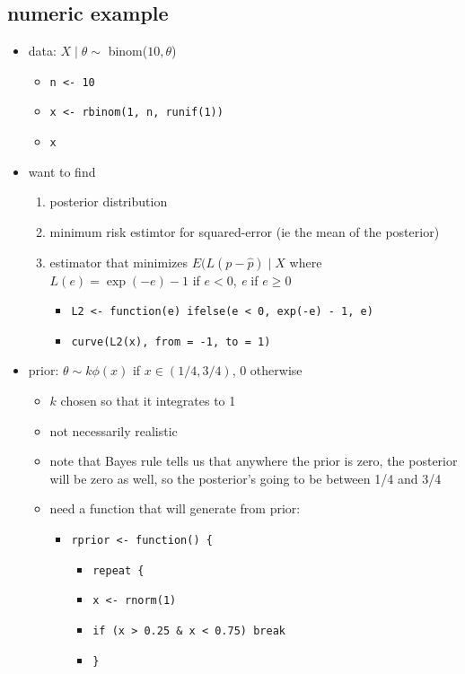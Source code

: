 \subsection{numeric example}

\begin{itemize}
\item data: $X \mid \theta \sim$ binom($10, \theta$)
\begin{itemize}
\item \texttt{n <- 10}
\item \texttt{x <- rbinom(1, n, runif(1))}
\item \texttt{x}
\end{itemize}
\item want to find
\begin{enumerate}
\item posterior distribution
\item minimum risk estimtor for squared-error (ie the mean of the posterior)
\item estimator that minimizes $E(L(p - \hat p) \mid X$ where
          $L(e) = \exp(-e) - 1$ if $e < 0$, \emph{e} if $e \geq 0$
\begin{itemize}
\item \texttt{L2 <- function(e) ifelse(e < 0, exp(-e) - 1, e)}
\item \texttt{curve(L2(x), from = -1, to = 1)}
\end{itemize}
\end{enumerate}
\item prior: $\theta \sim k \phi(x)$ if $x \in (1/4, 3/4)$, 0 otherwise
\begin{itemize}
\item $k$ chosen so that it integrates to 1
\item not necessarily realistic
\item note that Bayes rule tells us that anywhere the prior is zero,
         the posterior will be zero as well, so the posterior's going to be 
         between 1/4 and 3/4
\item need a function that will generate from prior:
\begin{itemize}
\item \texttt{rprior <- function() \{}
\begin{itemize}
\item \texttt{repeat \{}
\item \texttt{x <- rnorm(1)}
\item \texttt{if (x > 0.25 \& x < 0.75) break}
\item \texttt{\}}

\end{itemize}
\end{itemize}
\end{itemize}
\end{itemize}
